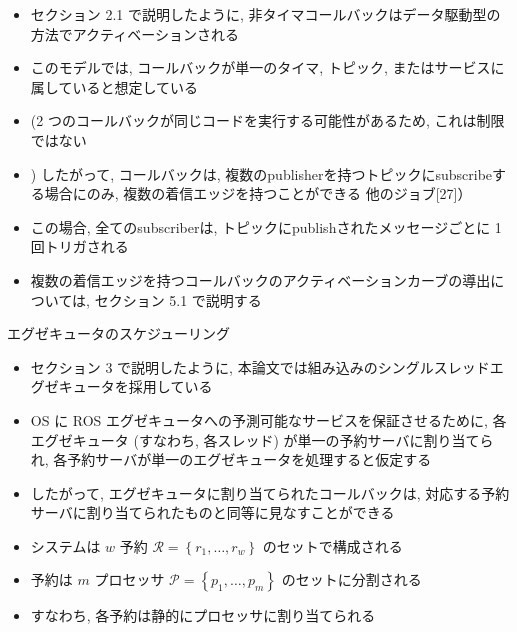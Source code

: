 \begin{frame}{}
    \begin{itemize}
        \item セクション 2.1 で説明したように, 非タイマコールバックはデータ駆動型の方法でアクティベーションされる
\item このモデルでは, コールバックが単一のタイマ, トピック, またはサービスに属していると想定している
\item (2 つのコールバックが同じコードを実行する可能性があるため, これは制限ではない
\item ) したがって, コールバックは, 複数のpublisherを持つトピックにsubscribeする場合にのみ, 複数の着信エッジを持つことができる 他のジョブ[27]）
\item この場合, 全てのsubscriberは, トピックにpublishされたメッセージごとに 1 回トリガされる
\item 複数の着信エッジを持つコールバックのアクティベーションカーブの導出については, セクション 5.1 で説明する
    \end{itemize}
\end{frame}

\begin{frame}{エグゼキュータのスケジューリング}
    \begin{itemize}
        \item セクション 3 で説明したように, 本論文では組み込みのシングルスレッドエグゼキュータを採用している
\item OS に ROS エグゼキュータへの予測可能なサービスを保証させるために, 各エグゼキュータ (すなわち, 各スレッド) が単一の予約サーバに割り当てられ, 各予約サーバが単一のエグゼキュータを処理すると仮定する
\item したがって, エグゼキュータに割り当てられたコールバックは, 対応する予約サーバに割り当てられたものと同等に見なすことができる
    \end{itemize}
\end{frame}

\begin{frame}{}
    \begin{itemize}
        \item システムは $w$ 予約 $\mathcal{R}=\left\{r_{1}, \ldots, r_{w}\right\}$ のセットで構成される
\item 予約は $m$ プロセッサ $\mathcal{P}=\left\{p_{1}, \ldots, p_{m}\right\}$ のセットに分割される
\item すなわち, 各予約は静的にプロセッサに割り当てられる
    \end{itemize}
\end{frame}

